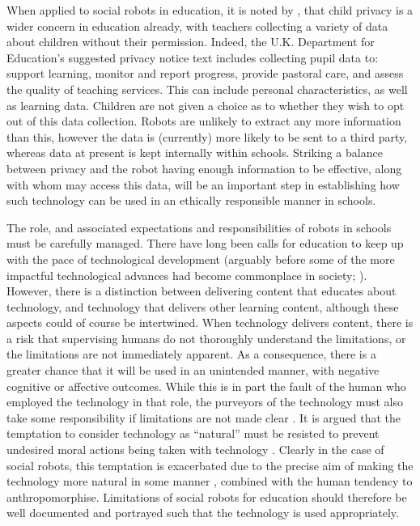 When applied to social robots in education, it is noted by \citet{serholt2016classroom}, that child privacy is a wider concern in education already, with teachers collecting a variety of data about children without their permission. Indeed, the U.K. Department for Education's suggested privacy notice text \citep{dofe2016privacy} includes collecting pupil data to: support learning, monitor and report progress, provide pastoral care, and assess the quality of teaching services. This can include personal characteristics, as well as learning data. Children are not given a choice as to whether they wish to opt out of this data collection. Robots are unlikely to extract any more information than this, however the data is (currently) more likely to be sent to a third party, whereas data at present is kept internally within schools. Striking a balance between privacy and the robot having enough information to be effective, along with whom may access this data, will be an important step in establishing how such technology can be used in an ethically responsible manner in schools.

The role, and associated expectations and responsibilities of robots in schools must be carefully managed. There have long been calls for education to keep up with the pace of technological development (arguably before some of the more impactful technological advances had become commonplace in society; \citealp{will1986educating}). However, there is a distinction between delivering content that educates about technology, and technology that delivers other learning content, although these aspects could of course be intertwined. When technology delivers content, there is a risk that supervising humans do not thoroughly understand the limitations, or the limitations are not immediately apparent. As a consequence, there is a greater chance that it will be used in an unintended manner, with negative cognitive or affective outcomes. While this is in part the fault of the human who employed the technology in that role, the purveyors of the technology must also take some responsibility if limitations are not made clear \citep{johnson2005computer}. It is argued that the temptation to consider technology as ``natural'' must be resisted to prevent undesired moral actions being taken with technology \citep{johnson2005computer}. Clearly in the case of social robots, this temptation is exacerbated due to the precise aim of making the technology more natural in some manner \citep{breazeal2002designing}, combined with the human tendency to anthropomorphise. Limitations of social robots for education should therefore be well documented and portrayed such that the technology is used appropriately.

